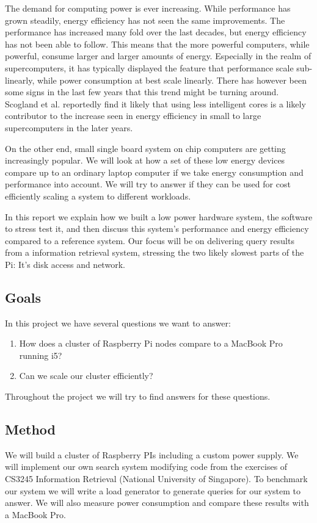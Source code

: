 The demand for computing power is ever increasing. While performance has grown steadily, energy efficiency has not seen the same improvements.
The performance has increased many fold over the last decades, but energy efficiency has not been able to follow. This means that the more powerful computers, while powerful, consume larger and larger amounts of energy.
Especially in the realm of supercomputers, it has typically displayed the feature that performance scale sub-linearly, while power consumption at best scale linearly.
There has however been some signs in the last few years that this trend might be turning around\cite{green500}.
Scogland et al.\cite{green500} reportedly find it likely that using less intelligent cores is a likely contributor to the increase seen in energy efficiency in small to large supercomputers in the later years.

On the other end, small single board system on chip computers are getting increasingly popular. 
We will look at how a set of these low energy devices compare up to an ordinary laptop computer if we take energy consumption and performance into account. We will try to answer if they can be used for cost efficiently scaling a system to different workloads.

In this report we explain how we built a low power hardware system, the software to stress test it, and then discuss this system's performance and energy efficiency compared to a reference system. Our focus will be on delivering query results from a information retrieval system, stressing the two likely slowest parts of the Pi:
It's disk access and network.

\subsection{Goals}
In this project we have several questions we want to answer:
\begin{enumerate}
\item How does a cluster of Raspberry Pi nodes compare to a MacBook Pro running i5?
\item Can we scale our cluster efficiently?
\end{enumerate}

Throughout the project we will try to find answers for these questions.

\subsection{Method}
We will build a cluster of Raspberry PIs including a custom power supply. We will implement our own search system modifying code from the exercises of CS3245 Information Retrieval (National University of Singapore). To benchmark our system we will write a load generator to generate queries for our system to answer. We will also measure power consumption and compare these results with a MacBook Pro.



